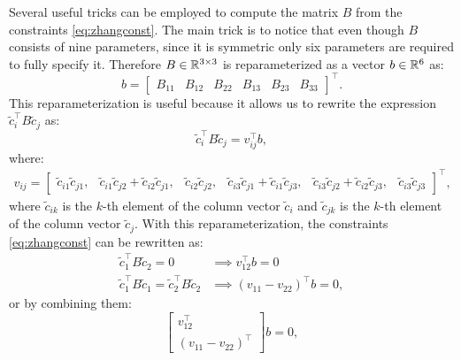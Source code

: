 Several useful tricks can be employed to compute the matrix $B$ from the constraints \eqref{eq:zhangconst}. The main trick is to notice that even though $B$ consists of nine parameters, since it is symmetric only six parameters are required to fully specify it. Therefore $B \in \mathbb{R}^{3\times 3}$ is reparameterized as a vector $b \in \mathbb{R}^6$ as:
\begin{equation}
    b = \begin{bmatrix}
        B_{11} & B_{12} & B_{22} & B_{13} & B_{23} & B_{33}
    \end{bmatrix}^\top .
\end{equation}
This reparameterization is useful because it allows us to rewrite the expression $\tilde{c}_i^\top B\tilde{c}_j$ as:
\begin{equation}
    \tilde{c}_i^\top B\tilde{c}_j = v_{ij}^\top  b,
\end{equation}
where:
\begin{equation*}
\begin{split}
   v_{ij} = \begin{bmatrix}
        \tilde{c}_{i1}\tilde{c}_{j1}, & \tilde{c}_{i1}\tilde{c}_{j2}+\tilde{c}_{i2}\tilde{c}_{j1}, & \tilde{c}_{i2}\tilde{c}_{j2}, & \tilde{c}_{i3}\tilde{c}_{j1} + \tilde{c}_{i1}\tilde{c}_{j3}, & \tilde{c}_{i3}\tilde{c}_{j2} + \tilde{c}_{i2}\tilde{c}_{j3}, & \tilde{c}_{i3}\tilde{c}_{j3}
    \end{bmatrix}^\top ,
\end{split}
\end{equation*}
where $\tilde{c}_{ik}$ is the $k$-th element of the column vector $\tilde{c}_i$ and $\tilde{c}_{jk}$ is the $k$-th element of the column vector $\tilde{c}_j$. With this reparameterization, the constraints \eqref{eq:zhangconst} can be rewritten as:
\begin{equation*}
\begin{split}
\tilde{c}_1^\top  B \tilde{c}_2 = 0 &\implies v_{12}^\top b = 0 \\
\tilde{c}_1^\top  B \tilde{c}_1 = \tilde{c}_2^\top  B \tilde{c}_2 &\implies (v_{11} - v_{22})^\top  b = 0,
\end{split}
\end{equation*}
or by combining them:
\begin{equation} \label{eq:bconst}
    \begin{bmatrix}
        v_{12}^\top  \\ (v_{11} - v_{22})^\top 
    \end{bmatrix}b = 0,
\end{equation}
